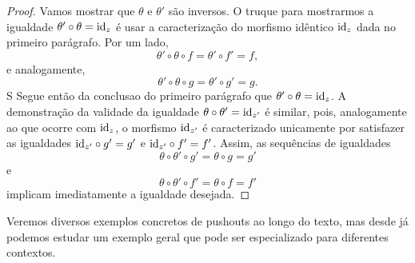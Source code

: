 \begin{proof}
    Vamos mostrar que $\theta$ e $\theta'$ são inversos.
    O truque para mostrarmos a igualdade $\theta' \circ \theta = \mathrm{id}_z$ é usar a caracterização do morfismo idêntico $\mathrm{id}_z$ dada no primeiro parágrafo.
    Por um lado,
    \begin{displaymath}
        \theta' \circ \theta \circ f
        = \theta' \circ f' = f,
    \end{displaymath}
    e analogamente,
    \begin{displaymath}
        \theta' \circ \theta \circ g
        = \theta' \circ g'
        = g.
    \end{displaymath}S
    Segue então da conclusao do primeiro parágrafo que $\theta' \circ \theta = \mathrm{id}_z$.
    A demonstração da validade da igualdade $\theta \circ \theta' = \mathrm{id}_{z'}$ é similar, pois, analogamente ao que ocorre com $\mathrm{id}_z$, o morfismo $\mathrm{id}_{z'}$ é caracterizado unicamente por satisfazer as igualdades $\mathrm{id}_{z'} \circ g' = g'$ e $\mathrm{id}_{z'} \circ f' = f'$.
    Assim, as sequências de igualdades
    \begin{displaymath}
        \theta \circ \theta' \circ g'
        = \theta \circ g
        = g'
    \end{displaymath}
    e
    \begin{displaymath}
        \theta \circ \theta' \circ f'
        = \theta \circ f
        = f'
    \end{displaymath}
    implicam imediatamente a igualdade desejada.
\end{proof}

Veremos diversos exemplos concretos de pushouts ao longo do texto, mas desde já podemos estudar um exemplo geral que pode ser especializado para diferentes contextos.

